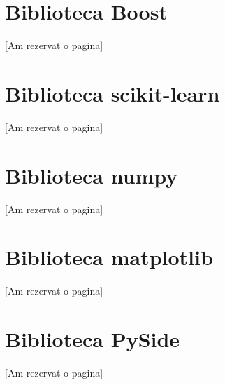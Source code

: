 



\section{Biblioteca Boost}
[Am rezervat o pagina]
\pagebreak


\section{Biblioteca scikit-learn}
[Am rezervat o pagina]
\pagebreak

\section{Biblioteca numpy}
[Am rezervat o pagina]
\pagebreak

\section{Biblioteca matplotlib}
[Am rezervat o pagina]
\pagebreak

\section{Biblioteca PySide}
[Am rezervat o pagina]
\pagebreak